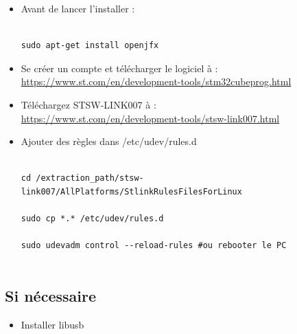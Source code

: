 \documentclass{article}
\begin{document}
\begin{itemize}
   
\begin{itemize}
   



 \item Avant de lancer l'installer :
\begin{verbatim}

sudo apt-get install openjfx

\end{verbatim}

 \item Se créer un compte et télécharger le logiciel à : \\

\url{https://www.st.com/en/development-tools/stm32cubeprog.html}

\item Téléchargez STSW-LINK007 à : \\ 
\url{https://www.st.com/en/development-tools/stsw-link007.html}


\item Ajouter des règles dans /etc/udev/rules.d

\begin{verbatim}

cd /extraction_path/stsw-link007/AllPlatforms/StlinkRulesFilesForLinux

sudo cp *.* /etc/udev/rules.d

sudo udevadm control --reload-rules #ou rebooter le PC


\end{verbatim}

\end{itemize}

\subsection{Si nécessaire}

\begin{itemize}
    



\item Installer libusb


\end{itemize}
\end{itemize}
\end{document}

